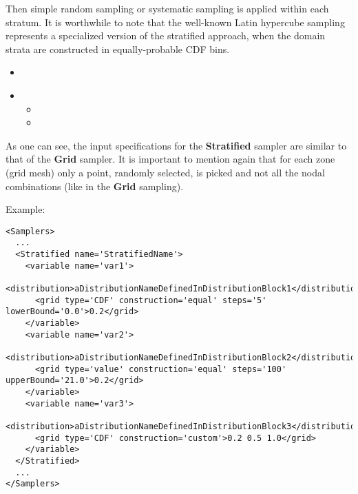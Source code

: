 Then simple random sampling or systematic sampling is applied within each
stratum.
%
It is worthwhile to note that the well-known Latin hypercube sampling represents
a specialized version of the stratified approach, when the domain strata are
constructed in equally-probable CDF bins.

%
\attrIntro
\begin{itemize}
\itemsep0em
\item \nameDescription
\end{itemize}
\begin{itemize}
\item \variableDescription
 \subnodesIntro
 \begin{itemize}
    \item \distributionDescription
    \item \gridDescription
  \end{itemize}
\end{itemize}

As one can see, the input specifications for the \textbf{Stratified} sampler are
similar to that of the \textbf{Grid} sampler.
%
It is important to mention again that for each zone (grid mesh) only a point,
randomly selected, is picked and not all the nodal combinations (like in the
\textbf{Grid} sampling).

Example:
\begin{lstlisting}[style=XML,morekeywords={construction,steps,lowerBound,upperBound}]
<Samplers>
  ...
  <Stratified name='StratifiedName'> 
    <variable name='var1'> 
      <distribution>aDistributionNameDefinedInDistributionBlock1</distribution> 
      <grid	type='CDF' construction='equal' steps='5' lowerBound='0.0'>0.2</grid>	
    </variable>
    <variable name='var2'> 
      <distribution>aDistributionNameDefinedInDistributionBlock2</distribution> 
      <grid	type='value' construction='equal' steps='100' upperBound='21.0'>0.2</grid>	
    </variable> 
    <variable name='var3'> 
      <distribution>aDistributionNameDefinedInDistributionBlock3</distribution> 
      <grid	type='CDF' construction='custom'>0.2 0.5 1.0</grid>	
    </variable>
  </Stratified>
  ...
</Samplers>
\end{lstlisting}

